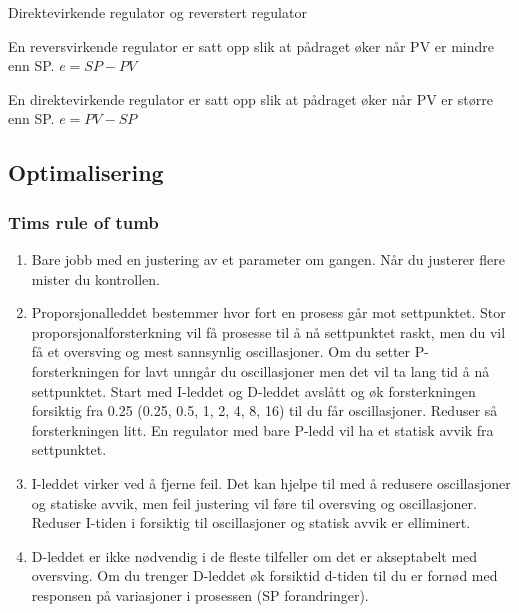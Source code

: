 \documentclass[10pt,a5paper]{article}
\begin{document}
\vskip 5pt 
Direktevirkende regulator og reverstert regulator

\vskip 5pt 
En reversvirkende regulator er satt opp slik at pådraget øker når
PV er mindre enn SP. $e=SP-PV$

\vskip 5pt 
En direktevirkende regulator er satt opp slik at pådraget øker når
PV er større enn SP. $e=PV-SP$
\vfil \eject
\subsection{Optimalisering}
\subsubsection{Tims rule of tumb}
\begin{enumerate}
	\item Bare jobb med en justering av et parameter om gangen. Når du justerer flere mister du kontrollen. 
	\item Proporsjonalleddet bestemmer hvor fort en prosess går mot settpunktet. Stor proporsjonalforsterkning vil få prosesse til å nå settpunktet raskt, men du vil få et oversving og mest sannsynlig oscillasjoner. Om du setter P-forsterkningen for lavt unngår du oscillasjoner men det vil ta lang tid å nå settpunktet. Start med I-leddet og D-leddet avslått og øk forsterkningen forsiktig  fra 0.25 (0.25, 0.5, 1, 2, 4, 8, 16) til du får oscillasjoner. Reduser så forsterkningen litt. En regulator med bare P-ledd vil ha et statisk avvik fra settpunktet. 
	\item I-leddet virker ved å fjerne feil. Det kan hjelpe til med å redusere oscillasjoner og statiske avvik, men feil justering vil føre til oversving og oscillasjoner. Reduser I-tiden i forsiktig til oscillasjoner og statisk avvik er elliminert. 
	\item D-leddet er ikke nødvendig i de fleste tilfeller om det er akseptabelt med oversving. Om du trenger D-leddet øk forsiktid d-tiden til du er fornød med responsen på variasjoner i prosessen  (SP forandringer).
\end{enumerate}
\end{document}

